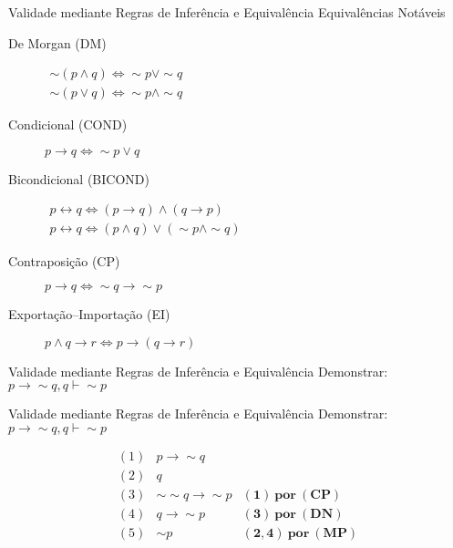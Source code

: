 \begin{frame}[t]{Validade mediante Regras de Inferência e Equivalência}	
	Equivalências Notáveis
	
	\begin{description}
	\item[De Morgan (DM)] $\begin{array}{l}\sim (p \wedge q) \Leftrightarrow \sim p \vee\sim q\\ \sim (p \vee q) \Leftrightarrow \sim p \wedge\sim q\end{array}$
	
	\item[Condicional (COND)] $p \rightarrow q \Leftrightarrow \sim p \vee q$
	
	\item[Bicondicional (BICOND)] $\begin{array}{l}p \leftrightarrow q \Leftrightarrow (p \rightarrow q) \wedge (q \rightarrow p)\\p \leftrightarrow q \Leftrightarrow (p \wedge q) \vee (\sim p \wedge\sim q)\end{array}$
	
	\item[Contraposição (CP)] $p \rightarrow q \Leftrightarrow \sim q \rightarrow\sim p$
	
	\item[Exportação--Importação (EI)] $p \wedge q \rightarrow r \Leftrightarrow p \rightarrow (q \rightarrow r)$
	\end{description}
\end{frame}


\begin{frame}[t]{Validade mediante Regras de Inferência e Equivalência}
	Demonstrar: $p \rightarrow\sim q, q \vdash \sim p$
\end{frame}


\begin{frame}[t]{Validade mediante Regras de Inferência e Equivalência}
	Demonstrar: $p \rightarrow\sim q, q \vdash \sim p$
	
	\vskip 0.5cm
	
	$$\begin{array}{lll}
	(1) & p \rightarrow\sim q  & \\
	(2) & q & \\
	\hline
	(3) & \sim\sim q \rightarrow\sim p & \mathbf{(1)~por~(CP)}\\
	(4) & q \rightarrow\sim p & \mathbf{(3)~por~(DN)} \\
	(5) & \sim p & \mathbf{(2,4)~por~(MP)} \\
	\end{array}$$	
\end{frame}


